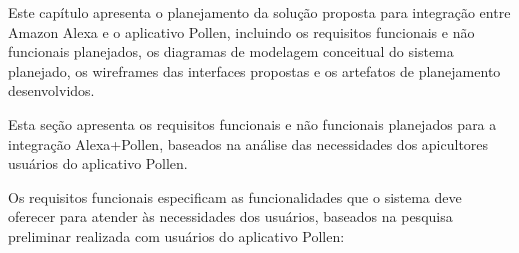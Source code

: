 \label{cap:apresentacao-solucao}

Este capítulo apresenta o planejamento da solução proposta para integração entre Amazon Alexa e o aplicativo Pollen, incluindo os requisitos funcionais e não funcionais planejados, os diagramas de modelagem conceitual do sistema planejado, os wireframes das interfaces propostas e os artefatos de planejamento desenvolvidos.

\label{sec:requisitos-sistema}

Esta seção apresenta os requisitos funcionais e não funcionais planejados para a integração Alexa+Pollen, baseados na análise das necessidades dos apicultores usuários do aplicativo Pollen.


Os requisitos funcionais especificam as funcionalidades que o sistema deve oferecer para atender às necessidades dos usuários, baseados na pesquisa preliminar realizada com usuários do aplicativo Pollen:

